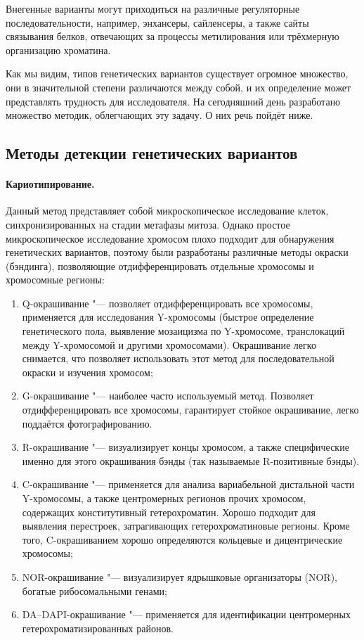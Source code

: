 \documentclass[a4paper,12pt]{article}
\begin{document}
Внегенные варианты могут приходиться на различные регуляторные последовательности, например, энхансеры, сайленсеры, а также сайты связывания белков, отвечающих за процессы метилирования или трёхмерную организацию хроматина.

Как мы видим, типов генетических вариантов существует огромное множество, они в значительной степени различаются между собой, и их определение может представлять трудность для исследователя.
На сегодняшний день разработано множество методик, облегчающих эту задачу.
О них речь пойдёт ниже.

\subsection{Методы детекции генетических вариантов}

\paragraph{Кариотипирование.}
Данный метод представляет собой микроскопическое исследование клеток, синхронизированных на стадии метафазы митоза.
Однако простое микроскопическое исследование хромосом плохо подходит для обнаружения генетических вариантов, поэтому были разработаны различные методы окраски (бэндинга), позволяющие отдифференцировать отдельные хромосомы и хромосомные регионы\cite{schreck}:

\begin{enumerate}
\item Q-окрашивание "--- позволяет отдифференцировать все хромосомы, применяется для исследования Y-хромосомы (быстрое определение генетического пола, выявление мозаицизма по Y-хромосоме, транслокаций между Y-хромосомой и другими хромосомами).
Окрашивание легко снимается, что позволяет использовать этот метод для последовательной окраски и изучения хромосом;
\item G-окрашивание "--- наиболее часто используемый метод.
Позволяет отдифференцировать все хромосомы, гарантирует стойкое окрашивание, легко поддаётся фотографированию.
\item R-окрашивание "--- визуализирует концы хромосом, а также специфические именно для этого окрашивания бэнды (так называемые R-позитивные бэнды).
\item C-окрашивание "--- применяется для анализа вариабельной дистальной части Y-хромосомы, а также центромерных регионов прочих хромосом, содержащих конститутивный гетерохроматин.
Хорошо подходит для выявления перестроек, затрагивающих гетерохроматиновые регионы.
Кроме того, C-окрашиванием хорошо определяются кольцевые и дицентрические хромосомы;
\item NOR-окрашивание "--- визуализирует ядрышковые организаторы (NOR), богатые рибосомальными генами;
\item DA--DAPI-окрашивание "--- применяется для идентификации центромерных гетерохроматизированных районов.
\end{enumerate}
\end{document}
